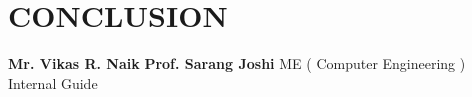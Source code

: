 \documentclass[a4paper, 12pt, notitlepage]{article}
\begin{document}
\section{CONCLUSION}
%
%
%    
%    
%
%    
    

%
%
%        

\vspace{20mm}

\begin{flushleft}

\textbf{Mr. Vikas R. Naik}    \hspace{40mm}       \textbf{Prof. Sarang Joshi}
\linebreak
ME ( Computer Engineering ) \hspace{30mm}   Internal Guide
\end{flushleft}
\end{document}

